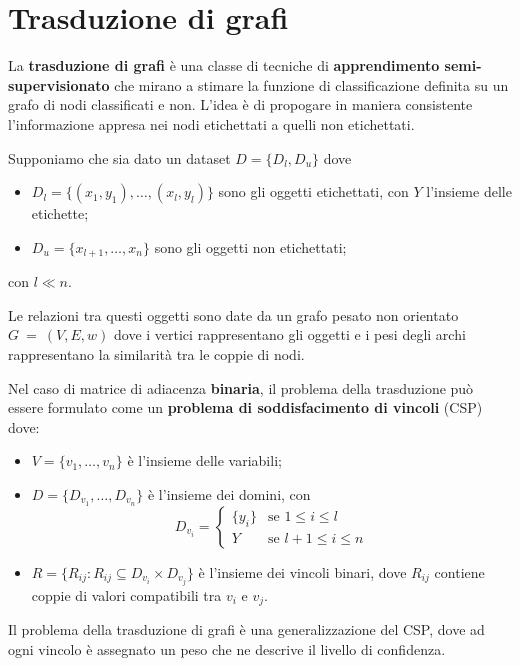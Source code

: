 \section{Trasduzione di grafi}
\label{sec:trasduzione_di_grafi}

La \textbf{trasduzione di grafi} è una classe di tecniche di \textbf{apprendimento semi-supervisionato} che mirano a stimare la funzione di classificazione definita su un grafo di nodi classificati e non. L'idea è di propogare in maniera consistente l'informazione appresa nei nodi etichettati a quelli non etichettati.

Supponiamo che sia dato un dataset $D = \{D_l, D_u\}$ dove
\begin{itemize}
	\item $D_l = \{(x_1, y_1), \dots, (x_l, y_l)\}$ sono gli oggetti etichettati, con $Y$ l'insieme delle etichette;
	\item $D_u = \{x_{l + 1}, \dots, x_n\}$ sono gli oggetti non etichettati;
\end{itemize}
con $l \ll n$.

Le relazioni tra questi oggetti sono date da un grafo pesato non orientato $G~=~(V, E, w)$ dove i vertici rappresentano gli oggetti e i pesi degli archi rappresentano la similarità tra le coppie di nodi.

Nel caso di matrice di adiacenza \textbf{binaria}, il problema della trasduzione può essere formulato come un \textbf{problema di soddisfacimento di vincoli} (CSP) dove:
\begin{itemize}
	\item $V = \{v_1, \dots, v_n\}$ è l'insieme delle variabili;
	\item $D = \{D_{v_1}, \dots, D_{v_n}\}$ è l'insieme dei domini, con
	\begin{displaymath}
		D_{v_i} = \begin{cases}
 			\{y_i\} & \text{se } 1 \leq i \leq l \\
 			Y & \text{se } l + 1 \leq i \leq n
 		\end{cases}
 	\end{displaymath}
 	\item $R = \{R_{ij} : R_{ij} \subseteq D_{v_i} \times D_{v_j}\}$ è l'insieme dei vincoli binari, dove $R_{ij}$ contiene coppie di valori compatibili tra $v_i$ e $v_j$.
\end{itemize}
Il problema della trasduzione di grafi è una generalizzazione del CSP, dove ad ogni vincolo è assegnato un peso che ne descrive il livello di confidenza.

